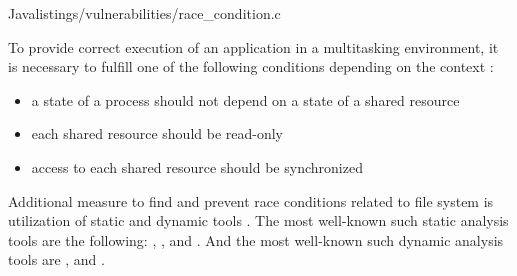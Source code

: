 {}
	{Java}{listings/vulnerabilities/race_condition.c}

%
To provide correct execution of an application in a multitasking environment, it is necessary to fulfill one of the following conditions depending on the context  : 
\begin{itemize}
	\item a state of a process should not depend on a state of a shared resource
	\item each shared resource should be read-only
	\item access to each shared resource should be synchronized
\end{itemize}

%
Additional measure to find and prevent race conditions related to file system is utilization of static and dynamic tools . 
%
The most well-known such static analysis tools are the following:  ,  , and  .
%
And the most well-known such dynamic analysis tools are  , and  . 